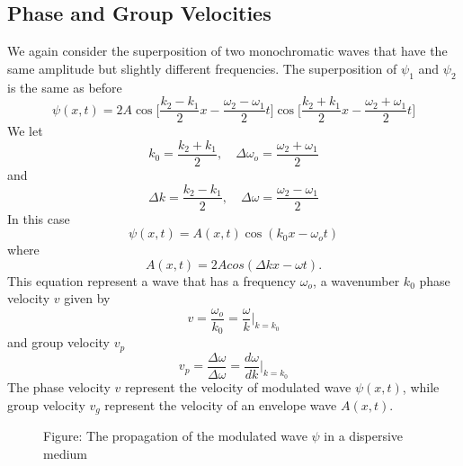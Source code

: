 \documentclass[../../../main.tex]{subfiles}
\begin{document}
\subsection{Phase and Group Velocities}
We again consider the superposition of two monochromatic waves that have the same amplitude but slightly different frequencies. The superposition of $\psi_1$ and $\psi_2$ is the same as before 
\begin{equation*}
    \psi(x,t)=2A\cos\bigg[\frac{k_2-k_1}{2}x-\frac{\omega_2-\omega_1}{2}t]\cos\bigg[\frac{k_2+k_1}{2}x-\frac{\omega_2+\omega_1}{2}t\bigg]
\end{equation*}
We let
\begin{equation*}
    k_0=\frac{k_2+k_1}{2},\quad      \Delta\omega_o=\frac{\omega_2+\omega_1}{2}
\end{equation*}
and
\begin{equation*}
    \Delta k=\frac{k_2-k_1}{2},\quad      \Delta\omega=\frac{\omega_2-\omega_1}{2}
\end{equation*}
In this case
\begin{equation*}
    \psi(x,t)=A(x, t) \cos(k_0x - \omega_ot) 
\end{equation*}
where 
\begin{equation*}
    A(x, t)=2A cos( \Delta k x- \omega t).
\end{equation*}
This equation represent a wave that has a frequency $\omega_o$, a wavenumber $k_0$ phase velocity $v$ given by
\begin{equation*}
      v=\frac{\omega_o}{k_0}=\frac{\omega}{k}\bigg|_{k=k_0}
\end{equation*}
and group velocity $v_p$
\begin{equation*}
    v_p=\frac{\Delta\omega}{\Delta\omega}=\frac{d\omega}{dk}\bigg|_{k=k_0}
\end{equation*}
The phase velocity $ v$ represent the velocity of modulated wave $\psi(x,t)$, while group velocity $v_g$ represent the velocity of an envelope wave $A(x,t)$. 

\begin{figure}
    \centering
    \caption*{Figure: The propagation of the modulated wave $\psi$ in a dispersive medium}
\end{figure}
\end{document}
